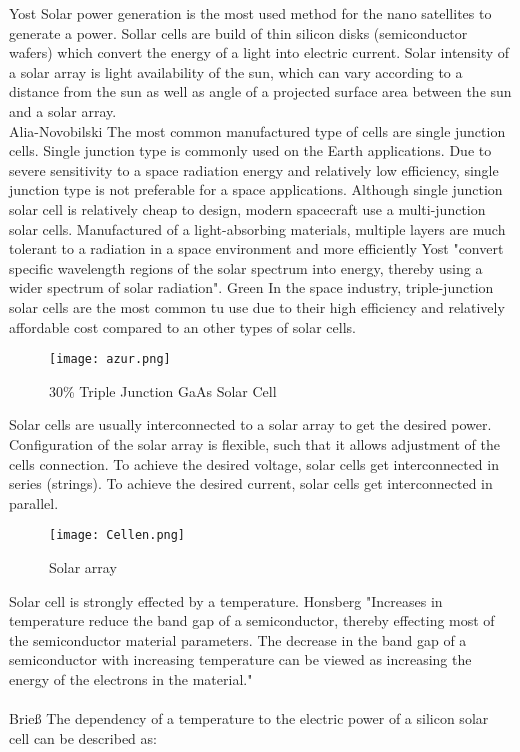 Yost\cite{1} Solar power generation is the most used method for the nano satellites to generate a power. Sollar cells are build of thin silicon disks (semiconductor wafers)  which convert the energy of a light into electric current. Solar intensity of a solar array is light availability of the sun, which can vary according to a distance from the sun as well as angle of a projected surface area between the sun and a solar array.  
\\
\noindent\hspace*{3mm} Alia-Novobilski\cite{2} The most common manufactured type of cells are single junction cells. Single junction type is commonly used on the Earth applications. Due to severe sensitivity to a space radiation energy and relatively low efficiency, single junction type is not preferable for a space applications. Although single junction solar cell is relatively cheap to design, modern spacecraft use a multi-junction solar cells. Manufactured of a light-absorbing materials, multiple layers are much tolerant to a radiation in a space environment and more efficiently  Yost\cite{1} "convert specific wavelength regions of the solar spectrum into energy, thereby using a wider spectrum of solar radiation". 
Green\cite{3} In the space industry, triple-junction solar cells are the most common tu use due to their high efficiency and relatively affordable cost compared to an other types of solar cells. 

\begin{figure}[h]
	\centering
	\texttt{[image: azur.png]}
	\caption{ 30\% Triple Junction GaAs Solar Cell \cite{4}}
	\label{fig: EPS}
\end{figure}

Solar cells are usually interconnected to a solar array to get the desired power. Configuration of the solar array is flexible, such that it allows adjustment of the cells connection. To achieve the desired voltage, solar cells get interconnected in series (strings). To achieve the desired current, solar cells get interconnected in parallel.\\

\newpage

\begin{figure}[h]
	\centering
	\texttt{[image: Cellen.png]}
	\caption{ Solar array}
	\label{fig: EPS}
\end{figure}
	
Solar cell is strongly effected by a temperature. Honsberg\cite{5} "Increases in temperature reduce the band gap of a semiconductor, thereby effecting most of the semiconductor material parameters. The decrease in the band gap of a semiconductor with increasing temperature can be viewed as increasing the energy of the electrons in the material."\\
\\
Brieß\cite{6} The dependency of a temperature to the electric power of a silicon solar cell can be described as:\\ \\ \\

